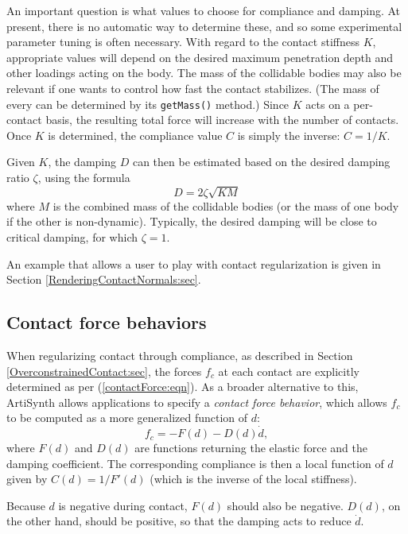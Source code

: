An important question is what values to choose for compliance and
damping. At present, there is no automatic way to determine these, and
so some experimental parameter tuning is often necessary. With regard
to the contact stiffness $K$, appropriate values will depend on the
desired maximum penetration depth and other loadings acting on the
body. The mass of the collidable bodies may also be relevant if one
wants to control how fast the contact stabilizes. (The mass of every
 can be
determined by its {\tt getMass()} method.)  Since $K$ acts on a
per-contact basis, the resulting total force will increase with the
number of contacts. Once $K$ is determined, the compliance value $C$
is simply the inverse: $C = 1/K$.

Given $K$, the damping $D$ can then be estimated based on the desired
damping ratio $\zeta$, using the formula
%
\begin{equation}
D = 2 \zeta \sqrt{K M}
\label{contactDamping:eqn}
\end{equation}
%
where $M$ is the combined mass of the collidable bodies (or the mass
of one body if the other is non-dynamic).  Typically, the desired
damping will be close to critical damping, for which $\zeta = 1$.

An example that allows a user to play with contact regularization is
given in Section \ref{RenderingContactNormals:sec}.

\subsection{Contact force behaviors}
\label{ContactForceBehavior:sec}

When regularizing contact through compliance, as described in
Section \ref{OverconstrainedContact:sec}, the forces $f_c$ at each
contact are explicitly determined as per (\ref{contactForce:eqn}).  As
a broader alternative to this, ArtiSynth allows applications to
specify a {\it contact force behavior}, 
which allows $f_c$ to be computed as a more generalized function of
$d$:
%
\begin{equation}
f_c = - F (d) - D (d) \dot d,
\label{generalContactForce:eqn}
\end{equation}
%
where $F(d)$ and $D(d)$ are functions returning the elastic force and
the damping coefficient. The corresponding compliance is then a local
function of $d$ given by $C(d) = 1/F'(d)$ (which is the inverse of the
local stiffness).

\begin{sideblock}
Because $d$ is negative during contact, $F(d)$ should also be
negative.  $D(d)$, on the other hand, should be positive, so that the
damping acts to reduce $\dot d$.
\end{sideblock}

